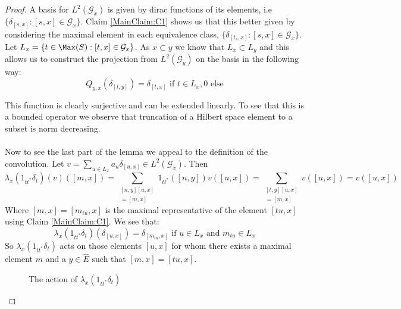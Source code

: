 \documentclass[11pt]{amsart}
\theoremstyle{plain}
\theoremstyle{definition}%
\theoremstyle{remark}%
\begin{document}
\begin{proof}
A basis for $L^{2}(\mathcal{G}_{x})$ is given by dirac functions of its elements, i.e $\lbrace \delta_{[s,x]} : [s,x] \in \mathcal{G}_{x} \rbrace$. Claim \ref{MainClaim:C1} shows us that this better given by considering the maximal element in each equivalence class, $\lbrace \delta_{[t_{s},x]} : [s,x] \in \mathcal{G}_{x} \rbrace$. Let $L_{x} = \lbrace t \in \Max(S) : [t,x] \in \mathcal{G}_{x} \rbrace$. As $x \subset y$ we know that $L_{x} \subset L_{y}$ and this  allows us to construct the projection from $L^{2}(\mathcal{G}_{y})$ on the basis in the following way:
\begin{equation}
Q_{y,x}(\delta_{[t,y]})=\delta_{[t,x]} \mbox{ if } t \in L_{x}, 0 \mbox{ else}  
\end{equation}

This function is clearly surjective and can be extended linearly. To see that this is a bounded operator we observe that truncation of a Hilbert space element to a subset is norm decreasing.\\
\\
Now to see the last part of the lemma we appeal to the definition of the convolution. Let $v = \sum_{u \in L_{x}} a_{u}\delta_{[u,x]} \in L^{2}(\mathcal{G}_{x})$. Then
\begin{equation*}
\lambda_{x}(1_{tt^{*}}\delta_{t})(v)([m,x])=\sum_{\substack{[n,y][u,x]\\=[m,x]}} 1_{tt^{*}}([n,y])v([u,x])=\sum_{\substack{[t,y][u,x]\\=[m,x]}}v([u,x])=v([u,x])
\end{equation*}
Where $[m,x]=[m_{tu},x]$ is the maximal representative of the element $[tu,x]$ using Claim \ref{MainClaim:C1}. We see that:
\begin{equation*}
\lambda_{x}(1_{tt^{*}}\delta_{t})(\delta_{[u,x]})= \delta_{[m_{tu},x]} \mbox{ if } u\in L_{x} \mbox{ and } m_{tu} \in L_{x}
\end{equation*}
So $\lambda_{x}(1_{tt^{*}}\delta_{t})$ acts on those elements $[u,x]$ for whom there exists a maximal element $m$ and a $y \in \widehat{E}$ such that $[m,x]=[tu,x]$. 

\begin{figure}\label{fig:F1}





\caption{The action of $\lambda_{x}(1_{tt^{*}}\delta_{t})$}


\end{figure}
\end{proof}
\end{document}
